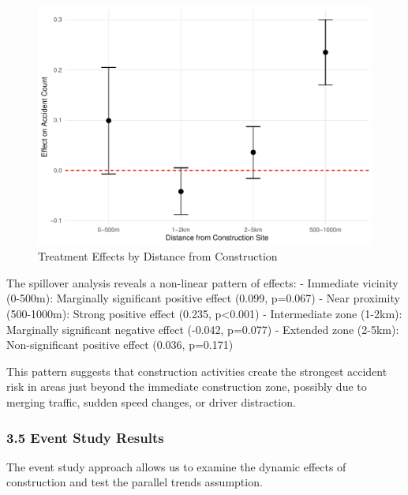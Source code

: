 \documentclass[
]{article}
\begin{document}
\begin{figure}

{\centering \includegraphics[width=1\linewidth]{test_files/figure-latex/spillover_figure-1} 

}

\caption{Treatment Effects by Distance from Construction}\label{fig:spillover_figure}
\end{figure}

The spillover analysis reveals a non-linear pattern of effects: -
Immediate vicinity (0-500m): Marginally significant positive effect
(0.099, p=0.067) - Near proximity (500-1000m): Strong positive effect
(0.235, p\textless0.001) - Intermediate zone (1-2km): Marginally
significant negative effect (-0.042, p=0.077) - Extended zone (2-5km):
Non-significant positive effect (0.036, p=0.171)

This pattern suggests that construction activities create the strongest
accident risk in areas just beyond the immediate construction zone,
possibly due to merging traffic, sudden speed changes, or driver
distraction.

\subsubsection{3.5 Event Study Results}\label{event-study-results}

The event study approach allows us to examine the dynamic effects of
construction and test the parallel trends assumption.
\end{document}
